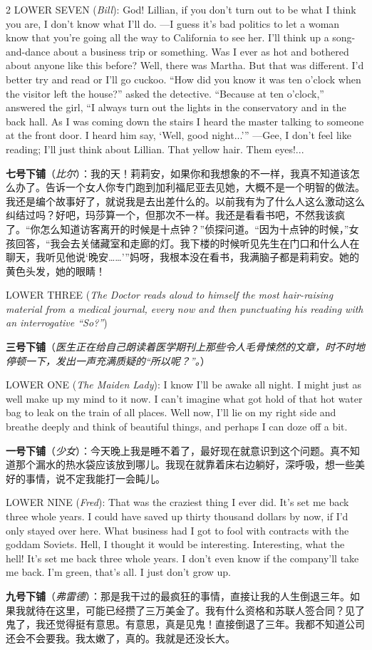 \documentclass[lang=cn,newtx,10pt,scheme=chinese]{elegantbook}
\newcommand{\pair}[2]{%
\switchcolumn* #2\par
\switchcolumn  #1\par
}
\begin{document}
\begin{paracol}{2}
\pair{
    \textbf{七号下铺}（\textit{比尔}）：我的天！莉莉安，如果你和我想象的不一样，我真不知道该怎么办了。告诉一个女人你专门跑到加利福尼亚去见她，大概不是一个明智的做法。我还是编个故事好了，就说我是去出差什么的。以前我有为了什么人这么激动这么纠结过吗？好吧，玛莎算一个，但那次不一样。我还是看看书吧，不然我该疯了。“你怎么知道访客离开的时候是十点钟？”侦探问道。“因为十点钟的时候，”女孩回答，“我会去关储藏室和走廊的灯。我下楼的时候听见先生在门口和什么人在聊天，我听见他说‘晚安……’”妈呀，我根本没在看书，我满脑子都是莉莉安。她的黄色头发，她的眼睛！
}{
    LOWER SEVEN (\textit{Bill}): God! Lillian, if you don't turn out to be what I think you are, I don't know what I'll do. —I guess it's bad politics to let a woman know that you're going all the way to California to see her. I'll think up a song-and-dance about a business trip or something. Was I ever as hot and bothered about anyone like this before? Well, there was Martha. But that was different. I'd better try and read or I'll go cuckoo. “How did you know it was ten o'clock when the visitor left the house?” asked the detective. “Because at ten o'clock,” answered the girl, “I always turn out the lights in the conservatory and in the back hall. As I was coming down the stairs I heard the master talking to someone at the front door. I heard him say, ‘Well, good night...’” —Gee, I don't feel like reading; I'll just think about Lillian. That yellow hair. Them eyes!...
}

\pair{
    \textbf{三号下铺}（\textit{医生正在给自己朗读着医学期刊上那些令人毛骨悚然的文章，时不时地停顿一下，发出一声充满质疑的“所以呢？”。}）
}{
    LOWER THREE (\textit{The Doctor reads aloud to himself the most hair-raising material from a medical journal, every now and then punctuating his reading with an interrogative “So?”})
}

\pair{
    \textbf{一号下铺}（\textit{少女}）：今天晚上我是睡不着了，最好现在就意识到这个问题。真不知道那个漏水的热水袋应该放到哪儿。我现在就靠着床右边躺好，深呼吸，想一些美好的事情，说不定我能打一会盹儿。
}{
    LOWER ONE (\textit{The Maiden Lady}): I know I'll be awake all night. I might just as well make up my mind to it now. I can't imagine what got hold of that hot water bag to leak on the train of all places. Well now, I'll lie on my right side and breathe deeply and think of beautiful things, and perhaps I can doze off a bit.
}

\pair{
    \textbf{九号下铺}（\textit{弗雷德}）：那是我干过的最疯狂的事情，直接让我的人生倒退三年。如果我就待在这里，可能已经攒了三万美金了。我有什么资格和苏联人签合同？见了鬼了，我还觉得挺有意思。有意思，真是见鬼！直接倒退了三年。我都不知道公司还会不会要我。我太嫩了，真的。我就是还没长大。
}{
    LOWER NINE (\textit{Fred}): That was the craziest thing I ever did. It's set me back three whole years. I could have saved up thirty thousand dollars by now, if I'd only stayed over here. What business had I got to fool with contracts with the goddam Soviets. Hell, I thought it would be interesting. Interesting, what the hell! It's set me back three whole years. I don't even know if the company'll take me back. I'm green, that's all. I just don't grow up.
    \newline
    \newline
}


\end{paracol}
\end{document}
